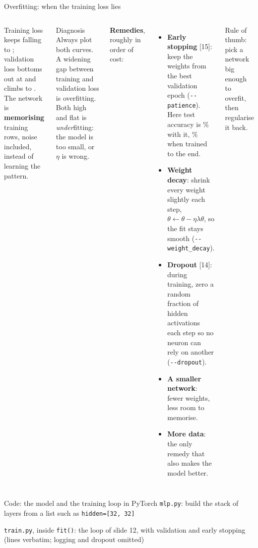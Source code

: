 \documentclass[aspectratio=169,10pt]{beamer}
\renewcommand{\cite}[1]{{\scriptsize\color{cTok}[#1]}}
\newcommand{\key}[1]{\textbf{\color{cAtt}#1}}
\begin{document}
\begin{frame}{Overfitting: when the training loss lies}
\begin{columns}[T,onlytextwidth]
\vspace{1.5mm}
\raggedright\small
Training loss keeps falling to \ofLastTrain; validation loss bottoms out at \ofBestVal{} and climbs
to \ofLastVal. The network is \textbf{memorising} training rows, noise included, instead of learning
the pattern.
\small
\begin{block}{Diagnosis}
\footnotesize
Always plot both curves. A widening gap between training and validation loss is overfitting.
Both high and flat is \emph{under}fitting: the model is too small, or $\eta$ is wrong.
\end{block}
\textbf{Remedies}, roughly in order of cost:
\begin{itemize}\footnotesize
  \item \key{Early stopping} \cite{15}: keep the weights from the best validation epoch
        (\texttt{-{}-patience}). Here test accuracy is \ofStoppedAcc\% with it,
        \ofLastAcc\% when trained to the end.
  \item \key{Weight decay}: shrink every weight slightly each step, $\theta\leftarrow\theta-\eta\lambda\theta$,
        so the fit stays smooth (\texttt{-{}-weight\_decay}).
  \item \key{Dropout} \cite{14}: during training, zero a random fraction of hidden activations each
        step so no neuron can rely on another (\texttt{-{}-dropout}).
  \item \key{A smaller network}: fewer weights, less room to memorise.
  \item \key{More data}: the only remedy that also makes the model better.
\end{itemize}
{\footnotesize Rule of thumb: pick a network big enough to overfit, then regularise it back.}
\end{columns}
\end{frame}

\begin{frame}[fragile]{Code: the model and the training loop in PyTorch}
\vspace{-1mm}
{\footnotesize \texttt{mlp.py}: build the stack of layers from a list such as \texttt{hidden=[32, 32]}}

\vspace{0.5mm}
{\footnotesize \texttt{train.py}, inside \texttt{fit()}: the loop of slide 12, with validation and early stopping (lines verbatim; logging and dropout omitted)}

\vspace{-0.5mm}

\end{frame}
\end{document}
